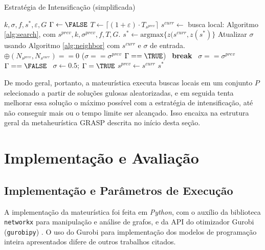 \documentclass{MO824}
\begin{document}
    \begin{algorithm}[H]
    \caption{Estratégia de Intensificação (simplificada)} 
    \label{alg:intense}
    \begin{algorithmic}[1]
        \REQUIRE $k, \sigma, f, s^*, \varepsilon, G$
        \STATE $\Gamma \leftarrow \FALSE$
            \STATE $T \leftarrow \lceil (1+\varepsilon)\cdot T_{s^{prev}} \rceil$  
            \STATE $s^{curr} \leftarrow$ busca local: Algoritmo \ref{alg:search}, com $s^{prev}, k, \sigma^{prev}, f, T, G$.
            \STATE $s^* \leftarrow \text{argmax}\{z(s^{curr}, z(s^*)\}$  
            \STATE Atualizar $\sigma$ usando Algoritmo \ref{alg:neighbor} com $s^{curr}$ e $\sigma$ de entrada.
            \STATE \algorithmicif \ $\oplus(N_{s^{prev}}, N_{s^{curr}}) == 0$ \OR ($\sigma == \sigma^{prev}$ \AND $\Gamma == \TRUE$) \algorithmicthen \ \textbf{break}
            \STATE \algorithmicif \ $\sigma == \sigma^{prev}$ \AND $\Gamma == \FALSE$ \algorithmicthen \ $\sigma \leftarrow 0.5$; $\Gamma = \TRUE$
            \STATE $s^{prev} \leftarrow s^{curr}$
        \ENDWHILE
        \RETURN $s^*$
    \end{algorithmic}
    \end{algorithm}
    
    De modo geral, portanto, a mateurística executa buscas locais em um conjunto $P$ selecionado a partir de soluções gulosas aleatorizadas, e em seguida tenta melhorar essa solução o máximo possível com a estratégia de intensificação, até não conseguir mais ou o tempo limite ser alcançado. Isso encaixa na estrutura geral da metaheurística GRASP descrita no início desta seção.
    
\section{Implementação e Avaliação}
    \subsection{Implementação e Parâmetros de Execução}

    A implementação da mateurística foi feita em \textit{Python}, com o auxílio da biblioteca \texttt{networkx} \cite{networkx} para manipulação e análise de grafos, e da API do otimizador Gurobi (\texttt{gurobipy}) \cite{gurobi}. O uso do Gurobi para implementação dos modelos de programação inteira apresentados difere de outros trabalhos citados. 
    
\end{document}
